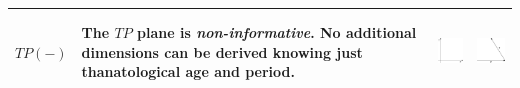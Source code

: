 \documentclass[
  12pt
]{scrartcl}
\begin{document}
\begin{center}
\begin{longtable}{m{}m{}m{}m{}}
  \midrule
  $TP(-)$ &
  The $TP$ plane is \emph{non-informative}. No additional dimensions can be derived knowing just thanatological age and period. &
  \includegraphics[height = 2cm]{../fig/TP.pdf} &
  \includegraphics[height = 2cm]{../fig/TP_iso.pdf}  \\
  \bottomrule
  \end{longtable}
\end{center}

\clearpage
\end{document}
